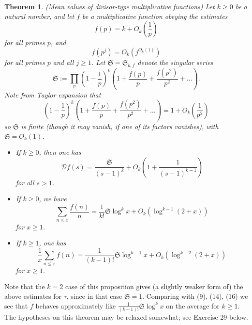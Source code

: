 \documentclass[10pt,reqno]{amsart}
\newtheorem{theorem}{Theorem}
\begin{document}
\begin{theorem} (Mean values of divisor-type multiplicative functions)
    Let $k \geq 0$ be a natural number, and let $f$ be a multiplicative function obeying the estimates
    \begin{equation}   f(p) = k + O_k \left( \frac{1}{p} \right) \end{equation}
    for all primes $p$, and
    \[  f(p^j) = O_k(j^{O_k(1)})\]
    for all primes $p$ and all $j \geq 1$. Let ${\mathfrak S} = {\mathfrak S}_{k,f}$ denote the \emph{singular series}
    \begin{equation}   {\mathfrak S} := \prod_p \left(1-\frac{1}{p}\right)^k \left(1 + \frac{f(p)}{p} + \frac{f(p^2)}{p^2} + \dots \right). \end{equation}
    Note from Taylor expansion that
    \[  (1-\frac{1}{p})^k (1 + \frac{f(p)}{p} + \frac{f(p^2)}{p^2} + \dots ) = 1 + O_k( \frac{1}{p^2} )\]
    so ${\mathfrak S}$ is finite (though it may vanish, if one of its factors vanishes), with ${\mathfrak S} = O_k(1)$.
    \begin{itemize}
        \item[(i)] If $k \geq 0$, then one has
        \[  {\mathcal D} f(s) = \frac{\mathfrak S}{(s-1)^k} + O_k( 1 + \frac{1}{(s-1)^{k-1}} )\]
        for all $s>1$.

        \item[(ii)] If $k \geq 0$, we have
        \[  \sum_{n \leq x} \frac{f(n)}{n} = \frac{1}{k!} {\mathfrak S} \log^k x + O_k( \log^{k-1}(2+x) )\]
        for $x \geq 1$.

        \item[(iii)] If $k \geq 1$, one has
        \[  \frac{1}{x} \sum_{n \leq x} f(n) = \frac{1}{(k-1)!} {\mathfrak S} \log^{k-1} x + O_k( \log^{k-2}(2+x) )\]
        for $x \geq 1$.
    \end{itemize}
\end{theorem}

Note that the $k=2$ case of this proposition gives (a slightly weaker form of) the above estimates for $\tau$, since in that case ${\mathfrak S}=1$. Comparing with (9), (14), (16) we see that $f$ behaves approximately like $\frac{1}{(k-1)!} {\mathfrak S} \log^k x$ on the average for $k \geq 1$. The hypotheses on this theorem may be relaxed somewhat; see Exercise 29 below.
\end{document}
